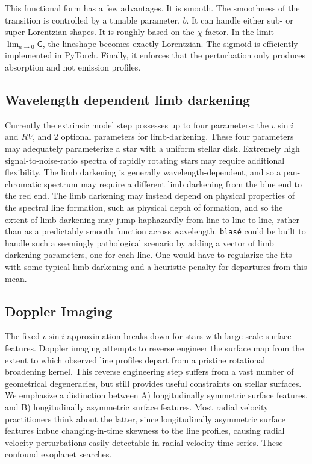\documentclass[twocolumn]{aastex631}
\begin{document}
This functional form has a few advantages. It is smooth. The smoothness of the transition is controlled by a tunable parameter, $b$. It can handle either sub- or super-Lorentzian shapes. It is roughly based on the $\chi$-factor. In the limit $\lim_{a\to0} \mathsf{G}$, the lineshape becomes exactly Lorentzian. The sigmoid is efficiently implemented in PyTorch.
Finally, it enforces that the perturbation only produces absorption and not emission profiles.

\subsection{Wavelength dependent limb darkening}
Currently the extrinsic model step possesses up to four parameters: the $v\sin{i}$ and $RV$, and 2 optional parameters for limb-darkening.  These four parameters may adequately parameterize a star with a uniform stellar disk.  Extremely high signal-to-noise-ratio spectra of rapidly rotating stars may require additional flexibility.  The limb darkening is generally wavelength-dependent, and so a pan-chromatic spectrum may require a different limb darkening from the blue end to the red end.  The limb darkening may instead depend on physical properties of the spectral line formation, such as physical depth of formation, and so the extent of limb-darkening may jump haphazardly from line-to-line-to-line, rather than as a predictably smooth function across wavelength.  \texttt{blas\'e} could be built to handle such a seemingly pathological scenario by adding a vector of limb darkening parameters, one for each line.  One would have to regularize the fits with some typical limb darkening and a heuristic penalty for departures from this mean.

\subsection{Doppler Imaging}
The fixed $v\sin{i}$ approximation breaks down for stars with large-scale surface features.  Doppler imaging attempts to reverse engineer the surface map from the extent to which observed line profiles depart from a pristine rotational broadening kernel.  This reverse engineering step suffers from a vast number of geometrical degeneracies, but still provides useful constraints on stellar surfaces.  We emphasize a distinction between A) longitudinally symmetric surface features, and B) longitudinally asymmetric surface features.  Most radial velocity practitioners think about the latter, since longitudinally asymmetric surface features imbue changing-in-time skewness to the line profiles, causing radial velocity perturbations easily detectable in radial velocity time series.  These confound exoplanet searches.
\end{document}
